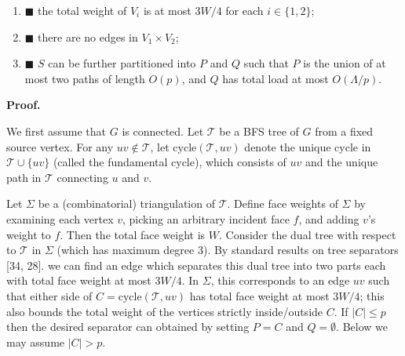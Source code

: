 \par
\begin{enumerate}
\item[]  $\blacksquare$ 
the total weight of $V_{i}$ is at most $3W/4$ for each $i\in\{1,2\}$;
\par
\par
\item[]  $\blacksquare$ 
there are no edges in $V_{1}\times V_{2}$;
\par
\par
\item[]  $\blacksquare$ 
$S$ can be further partitioned into $P$ and $Q$ such that $P$ is the union of at most two paths of length $O(p)$, and $Q$ has total load at most $O(\Lambda/p)$.
\par
\par
\end{enumerate}
\par
\par
\par\medskip\noindent\textbf{Proof.}\par
We first assume that $G$ is connected. Let $\mathcal{T}$ be a BFS tree of $G$ from a fixed source vertex. For any $uv\not\in\mathcal{T}$, let $\mathrm{cycle}(\mathcal{T},uv)$ denote the unique cycle in $\mathcal{T}\cup\{uv\}$ (called the fundamental cycle), which consists of $uv$ and the unique path in $\mathcal{T}$ connecting $u$ and $v$.
\par
\par
Let $\Sigma$ be a (combinatorial) triangulation of $\mathcal{T}$. Define face weights of $\Sigma$ by examining each vertex $v$, picking an arbitrary incident face $f$, and adding $v$’s weight to $f$. Then the total face weight is $W$. Consider the dual tree with respect to $\mathcal{T}$ in $\Sigma$ (which has maximum degree 3). By standard results on tree separators [34, 28]. we can find an edge which separates this dual tree into two parts each with total face weight at most $3W/4$. In $\Sigma$, this corresponds to an edge $uv$ such that either side of $C=\mathrm{cycle}(\mathcal{T},uv)$ has total face weight at most $3W/4$; this also bounds the total weight of the vertices strictly inside/outside $C$. If ${\left|C\right|}\leq p$ then the desired separator can obtained by setting $P=C$ and $Q=\emptyset$. Below we may assume ${\left|C\right|}>p$.
\par
\par
